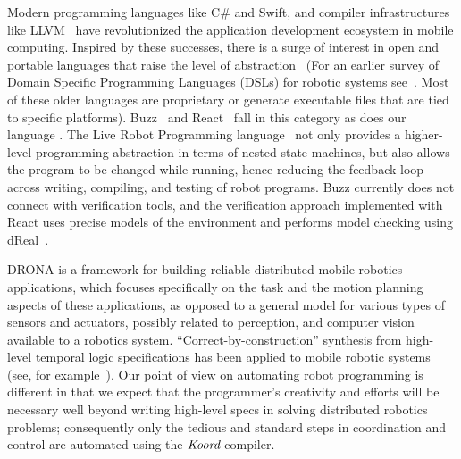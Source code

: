 Modern programming languages like C\# and Swift, and   compiler infrastructures like LLVM~\cite{llvm} have revolutionized the application development ecosystem in mobile computing.
Inspired by these successes, there is a surge of interest in open and portable languages that raise the level of abstraction~\cite{Buzzlanguage,Bohrer:2018:VVC:3192366.3192406,reactlang,williams2003model} (For an earlier survey of Domain Specific Programming Languages (DSLs) for robotic systems see~\cite{Nordmann2014}. Most of these older languages are proprietary or generate executable files that are tied to specific platforms).
%
Buzz~\cite{Buzzlanguage} and React~\cite{reactlang} fall in this category as does our language \lgname.
The Live Robot Programming language~\cite{campusanofabry:lrp2016} not only provides a higher-level programming abstraction in terms of nested state machines, but also allows the program to be changed while running, hence reducing the feedback loop across writing, compiling, and testing of robot programs.
Buzz currently does not  connect with  verification tools, and the verification approach implemented with React uses precise models of the environment and performs model checking using dReal~\cite{Gao2013}.

 DRONA is a framework for building reliable distributed mobile robotics applications, which focuses specifically on the task and the motion planning aspects of these applications, as opposed to a general model for various types of sensors and actuators, possibly related to perception, and computer vision available to a robotics system.
%
%
%
%
``Correct-by-construction'' synthesis from high-level temporal logic specifications has been applied to mobile robotic systems (see, for example~\cite{kress2009temporal,kloetzer2008fully,wongpiromsarn2010receding,wongpiromsarn2011tulip,ulusoy2013optimality}).
Our point of view on automating robot programming is different in that we expect that the programmer's creativity and efforts will be necessary well beyond writing high-level specs in solving distributed robotics problems; consequently only the tedious and standard steps in coordination and control are automated using the $\emph{Koord}$ compiler.


